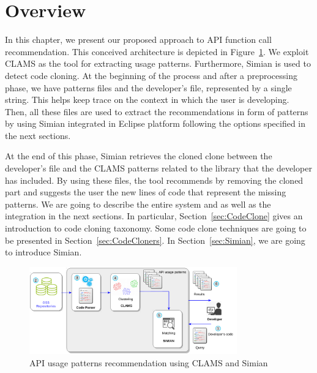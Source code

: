 



\section{Overview}

In this chapter, we present our proposed approach to API function call recommendation. This conceived architecture is depicted in Figure~\ref{fig:APIUsagePatternSimianCLAM}. We exploit CLAMS as the tool for extracting usage patterns. Furthermore, Simian is used to detect code cloning. At the beginning of the process and after a preprocessing phase, we have patterns files and the developer's file, represented by a single string. This helps keep trace on the context in which the user is developing. Then, all these files are used to extract the recommendations in form of patterns by using Simian integrated in Eclipse platform following the options specified in the next sections. 

At the end of this phase, Simian retrieves the cloned clone between the developer's file and the CLAMS patterns related to the library that the developer has included. By using these files, the tool recommends by removing the cloned part and suggests the user the new lines of code that represent the missing patterns. We are going to describe the entire system and as well as the integration in the next sections. In particular, Section~\ref{sec:CodeClone} gives an introduction to code cloning taxonomy. Some code clone techniques are going to be presented in Section~\ref{sec:CodeCloners}. In Section~\ref{sec:Simian}, we are going to introduce Simian. %

\begin{figure}[h!]
	\centering
	\includegraphics[width=0.80\textwidth]{images/APIUsagePatternSimianCLAM.pdf}
	\caption{API usage patterns recommendation using CLAMS and Simian}	
	\label{fig:APIUsagePatternSimianCLAM}	
\end{figure}


